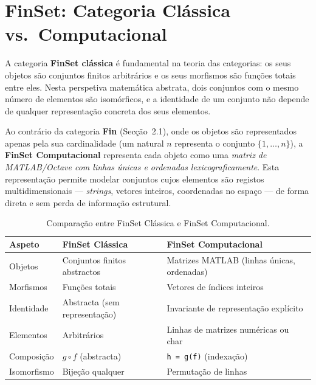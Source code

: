 %

\section{FinSet: Categoria Clássica vs.\ Computacional}

A categoria \textbf{FinSet clássica} é fundamental na teoria das
categorias: os seus objetos são conjuntos finitos arbitrários e
os seus morfismos são funções totais entre eles. Nesta perspetiva
matemática abstrata, dois conjuntos com o mesmo número de elementos
são isomórficos, e a identidade de um conjunto não depende de
qualquer representação concreta dos seus elementos.

Ao contrário da categoria \textbf{Fin} (Secção~2.1), onde os objetos
são representados apenas pela sua cardinalidade (um natural $n$
representa o conjunto $\{1,\ldots,n\}$), a \textbf{FinSet Computacional}
representa cada objeto como uma \emph{matriz de MATLAB/Octave com
	linhas únicas e ordenadas lexicograficamente}. Esta representação
permite modelar conjuntos cujos elementos são registos multidimensionais
--- \textit{strings}, vetores inteiros, coordenadas no espaço ---
de forma direta e sem perda de informação estrutural.

\begin{table}[htbp]
	\centering
	\caption{Comparação entre FinSet Clássica e FinSet Computacional.}
	\begin{tabular}{lll}
		\toprule
		\textbf{Aspeto} & \textbf{FinSet Clássica} & \textbf{FinSet Computacional} \\
		\midrule
		Objetos        & Conjuntos finitos abstractos       & Matrizes MATLAB (linhas únicas, ordenadas) \\
		Morfismos      & Funções totais                     & Vetores de índices inteiros \\
		Identidade     & Abstracta (sem representação)      & Invariante de representação explícito \\
		Elementos      & Arbitrários                        & Linhas de matrizes numéricas ou char \\
		Composição     & $g \circ f$ (abstracta)            & \texttt{h = g(f)} (indexação) \\
		Isomorfismo    & Bijeção qualquer                   & Permutação de linhas \\
		\bottomrule
	\end{tabular}
	\label{tab:finset_classica_vs_comp}
\end{table}

